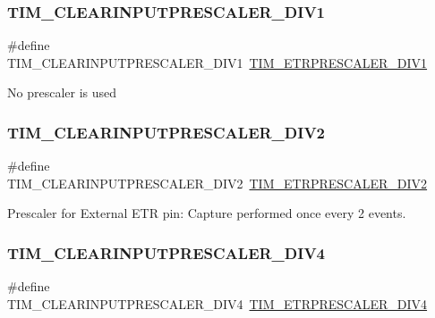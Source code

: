 \subsubsection{\texorpdfstring{TIM\_CLEARINPUTPRESCALER\_DIV1}{TIM\_CLEARINPUTPRESCALER\_DIV1}}
{\footnotesize\ttfamily \#define T\+I\+M\+\_\+\+C\+L\+E\+A\+R\+I\+N\+P\+U\+T\+P\+R\+E\+S\+C\+A\+L\+E\+R\+\_\+\+D\+I\+V1~\mbox{\hyperlink{group___t_i_m___e_t_r___prescaler_gabead5364c62645592e42545ba09ab88a}{T\+I\+M\+\_\+\+E\+T\+R\+P\+R\+E\+S\+C\+A\+L\+E\+R\+\_\+\+D\+I\+V1}}}

No prescaler is used \mbox{\label{group___t_i_m___clear_input___prescaler_gae54b2f4ea04ef97f7c75755347edc8ba}} 
\subsubsection{\texorpdfstring{TIM\_CLEARINPUTPRESCALER\_DIV2}{TIM\_CLEARINPUTPRESCALER\_DIV2}}
{\footnotesize\ttfamily \#define T\+I\+M\+\_\+\+C\+L\+E\+A\+R\+I\+N\+P\+U\+T\+P\+R\+E\+S\+C\+A\+L\+E\+R\+\_\+\+D\+I\+V2~\mbox{\hyperlink{group___t_i_m___e_t_r___prescaler_gaf7fe49f67bdb6b33b9b41953fee75680}{T\+I\+M\+\_\+\+E\+T\+R\+P\+R\+E\+S\+C\+A\+L\+E\+R\+\_\+\+D\+I\+V2}}}

Prescaler for External E\+TR pin\+: Capture performed once every 2 events. \mbox{\label{group___t_i_m___clear_input___prescaler_gae3c3dea810bb9d83b532737f01a3213d}} 
\subsubsection{\texorpdfstring{TIM\_CLEARINPUTPRESCALER\_DIV4}{TIM\_CLEARINPUTPRESCALER\_DIV4}}
{\footnotesize\ttfamily \#define T\+I\+M\+\_\+\+C\+L\+E\+A\+R\+I\+N\+P\+U\+T\+P\+R\+E\+S\+C\+A\+L\+E\+R\+\_\+\+D\+I\+V4~\mbox{\hyperlink{group___t_i_m___e_t_r___prescaler_gaa09da30c3cd28f1fe6b6f3f599a5212c}{T\+I\+M\+\_\+\+E\+T\+R\+P\+R\+E\+S\+C\+A\+L\+E\+R\+\_\+\+D\+I\+V4}}}

